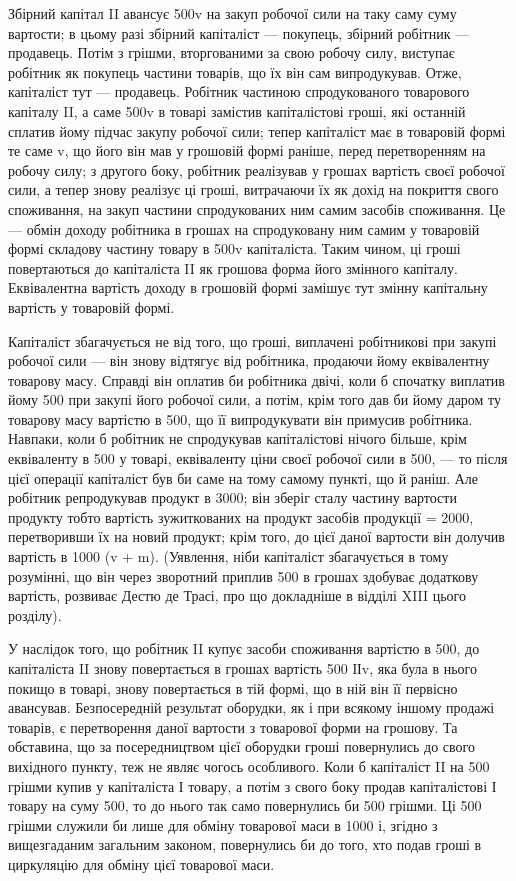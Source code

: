 Збірний капітал II авансує 500v на закуп робочої сили на таку саму
суму вартости; в цьому разі збірний капіталіст — покупець, збірний
робітник — продавець. Потім з грішми, вторгованими за свою робочу силу,
виступає робітник як покупець частини товарів, що їх він сам випродукував.
Отже, капіталіст тут — продавець. Робітник частиною спродукованого
товарового капіталу II, а саме 500v в товарі замістив капіталістові
гроші, які останній сплатив йому підчас закупу робочої сили; тепер
капіталіст має в товаровій формі те саме v, що його він мав у грошовій
формі раніше, перед перетворенням на робочу силу; з другого боку,
робітник реалізував у грошах вартість своєї робочої сили, а тепер знову
реалізує ці гроші, витрачаючи їх як дохід на покриття свого споживання,
на закуп частини спродукованих ним самим засобів споживання. Це —
обмін доходу робітника в грошах на спродуковану ним самим у товаровій
формі складову частину товару в 500v капіталіста. Таким чином,
ці гроші повертаються до капіталіста II як грошова форма його змінного
капіталу. Еквівалентна вартість доходу в грошовій формі замішує тут
змінну капітальну вартість у товаровій формі.

Капіталіст збагачується не від того, що гроші, виплачені робітникові
при закупі робочої сили — він знову відтягує від робітника, продаючи йому
еквівалентну товарову масу. Справді він оплатив би робітника двічі, коли
б спочатку виплатив йому 500 при закупі його робочої сили, а потім,
крім того дав би йому даром ту товарову масу вартістю в 500, що її
випродукувати він примусив робітника. Навпаки, коли б робітник не
спродукував капіталістові нічого більше, крім еквіваленту в 500 у товарі,
еквіваленту ціни своєї робочої сили в 500, — то після цієї операції капіталіст
був би саме на тому самому пункті, що й раніш. Але робітник
репродукував продукт в 3000; він зберіг сталу частину вартости
продукту тобто вартість зужиткованих на продукт засобів продукції = 2000,
перетворивши їх на новий продукт; крім того, до цієї даної
вартости він долучив вартість в 1000 (v + m). (Уявлення, ніби капіталіст
збагачується в тому розумінні, що він через зворотний приплив
500 в грошах здобуває додаткову вартість, розвиває Дестю де Трасі, про
що докладніше в відділі XIII цього розділу).

У наслідок того, що робітник II купує засоби споживання вартістю
в 500, до капіталіста II знову повертається в грошах вартість 500 ІІv,
яка була в нього покищо в товарі, знову повертається в тій формі, що
в ній він її первісно авансував. Безпосередній результат оборудки, як і
при всякому іншому продажі товарів, є перетворення даної вартости з
товарової форми на грошову. Та обставина, що за посередництвом цієї
оборудки гроші повернулись до свого вихідного пункту, теж не являє
чогось особливого. Коли б капіталіст II на 500 грішми купив у капіталіста
І товару, а потім з свого боку продав капіталістові І товару на
суму 500, то до нього так само повернулись би 500 грішми. Ці 500 грішми
служили би лише для обміну товарової маси в 1000 і, згідно з вищезгаданим
загальним законом, повернулись би до того, хто подав гроші в
циркуляцію для обміну цієї товарової маси.
